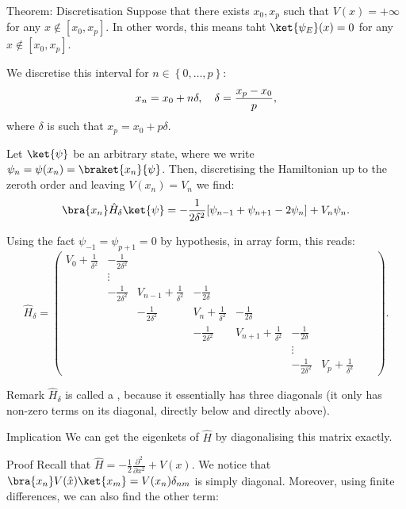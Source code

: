 \documentclass[a4paper]{article}
\begin{document}
\begin{parag}{Theorem: Discretisation}
    Suppose that there exists $x_0, x_p$ such that $V\left(x\right) = +\infty$ for any $x \not\in \left[x_0, x_p\right]$. In other words, this means taht $\ket{\psi_E}\left(x\right) = 0$ for any $x \not\in \left[x_0, x_p\right]$.

    We discretise this interval for $n \in \left\{0, \ldots, p\right\}$: 
    \[x_n = x_0 + n \delta, \quad \delta = \frac{x_p - x_0}{p},\]
    where $\delta$ is such that $x_p = x_0 + p \delta$.

    Let $\ket{\psi}$ be an arbitrary state, where we write $\psi_n = \psi\left(x_n\right) = \braket{x_n}{\psi}$. Then, discretising the Hamiltonian up to the zeroth order and leaving $V\left(x_n\right) = V_n$ we find: 
    \[\bra{x_n} \hat{H}_{\delta} \ket{\psi} = -\frac{1}{2\delta^2} \left[\psi_{n-1} + \psi_{n+1} - 2 \psi_n\right] + V_n \psi_n.\]

    Using the fact $\psi_{-1} = \psi_{p+1} = 0$ by hypothesis, in array form, this reads:
    \[\hat{H}_{\delta} = \begin{pmatrix} V_0 + \frac{1}{\delta^2} & -\frac{1}{2\delta^2} &   &  &  &   &   &   &   \\ & \vdots & &  & & &  \\  & -\frac{1}{2\delta^2} & V_{n-1} + \frac{1}{\delta^2} & -\frac{1}{2\delta} &  \\ &  & -\frac{1}{2\delta^2} & V_n + \frac{1}{\delta^2} & -\frac{1}{2\delta} &  \\  & & & -\frac{1}{2\delta^2} & V_{n+1} + \frac{1}{\delta^2} & -\frac{1}{2\delta} &  \\  & & &  &  & \vdots &  \\  & & &  &  & -\frac{1}{2\delta^2} & V_p + \frac{1}{\delta^2} \end{pmatrix}.\]

    \begin{subparag}{Remark}
        $\hat{H}_{\delta}$ is called a , because it essentially has three diagonals (it only has non-zero terms on its diagonal, directly below and directly above).
    \end{subparag}

    \begin{subparag}{Implication}
        We can get the eigenkets of $\hat{H}$ by diagonalising this matrix exactly.
    \end{subparag}

    \begin{subparag}{Proof}
        Recall that $\hat{H} = -\frac{1}{2} \frac{\partial^2}{\partial x^2} + V\left(x\right)$. We notice that $\bra{x_n} V\left(\hat{x}\right) \ket{x_m} = V\left(x_n\right) \delta_{nm}$ is simply diagonal. Moreover, using finite differences, we can also find the other term:


\end{subparag}
\end{parag}
\end{document}
